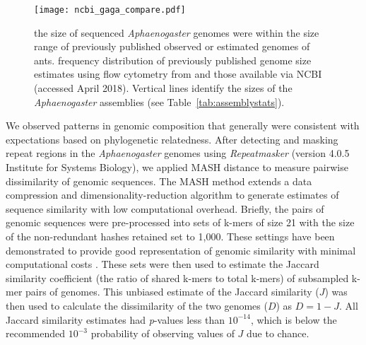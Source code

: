 \documentclass[fleqn,10pt,lineno]{wlpeerj} %
\begin{document}
\begin{figure}[ht]
\texttt{[image: ncbi\_gaga\_compare.pdf]} 
\caption{the size of sequenced \textit{Aphaenogaster} genomes were
  within the size range of previously published observed or estimated
  genomes of ants. frequency distribution of previously published
  genome size estimates using flow cytometry from \cite{Tsutsui2008a}
  and those available via NCBI (accessed April 2018). Vertical lines
  identify the sizes of the \textit{Aphaenogaster} assemblies (see
  Table~\ref{tab:assemblystats}).}
\label{fig:ncbi_compare}
\end{figure}

We observed patterns in genomic composition that generally were
consistent with expectations based on phylogenetic relatedness. After
detecting and masking repeat regions in the \emph{Aphaenogaster}
genomes using \textit{Repeatmasker} (version 4.0.5 Institute for
Systems Biology), we applied MASH distance \citep{Ondov2016} to
measure pairwise dissimilarity of genomic sequences. The MASH method
extends a data compression and dimensionality-reduction algorithm to
generate estimates of sequence similarity with low computational
overhead. Briefly, the pairs of genomic sequences were pre-processed
into sets of k-mers of size 21 with the size of the non-redundant
hashes retained set to 1,000. These settings have been demonstrated to
provide good representation of genomic similarity with minimal
computational costs \citep{Ondov2016}. These sets were then used to
estimate the Jaccard similarity coefficient (the ratio of shared
k-mers to total k-mers) of subsampled k-mer pairs of genomes. This
unbiased estimate of the Jaccard similarity ($J$) was then used to
calculate the dissimilarity of the two genomes ($D$) as $D = 1 -
J$. All Jaccard similarity estimates had \textit{p}-values less than
$10^{-14}$, which is below the recommended $10^{-3}$ probability of
observing values of $J$ due to chance.
\end{document}
